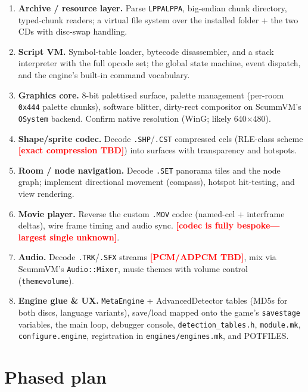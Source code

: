 \documentclass[11pt]{article}
\newcommand{\code}[1]{\texttt{#1}}
\newcommand{\todo}[1]{\textcolor{red}{\textbf{[#1]}}}
\begin{document}
\begin{enumerate}[label=\textbf{S\arabic*.},leftmargin=*]
  \item \textbf{Archive / resource layer.} Parse \code{LPPALPPA}, big-endian
        chunk directory, typed-chunk readers; a virtual file system over the
        installed folder + the two CDs with disc-swap handling.
  \item \textbf{Script VM.} Symbol-table loader, bytecode disassembler, and a
        stack interpreter with the full opcode set; the global state machine,
        event dispatch, and the engine's built-in command vocabulary.
  \item \textbf{Graphics core.} 8-bit palettised surface, palette management
        (per-room \code{0x444} palette chunks), software blitter, dirty-rect
        compositor on ScummVM's \code{OSystem} backend. Confirm native
        resolution (WinG; likely 640$\times$480).
  \item \textbf{Shape/sprite codec.} Decode \code{.SHP}/\code{.CST} compressed
        cels (RLE-class scheme \todo{exact compression TBD}) into surfaces with
        transparency and hotspots.
  \item \textbf{Room / node navigation.} Decode \code{.SET} panorama tiles and
        the node graph; implement directional movement (compass), hotspot
        hit-testing, and view rendering.
  \item \textbf{Movie player.} Reverse the custom \code{.MOV} codec
        (named-cel + interframe deltas), wire frame timing and audio sync.
        \todo{codec is fully bespoke---largest single unknown}.
  \item \textbf{Audio.} Decode \code{.TRK}/\code{.SFX} streams
        \todo{PCM/ADPCM TBD}, mix via ScummVM's \code{Audio::Mixer}, music
        themes with volume control (\code{themevolume}).
  \item \textbf{Engine glue \& UX.} \code{MetaEngine} + AdvancedDetector tables
        (MD5s for both discs, language variants), save/load mapped onto the
        game's \code{savestage} variables, the main loop, debugger console,
        \code{detection\_tables.h}, \code{module.mk}, \code{configure.engine},
        registration in \code{engines/engines.mk}, and POTFILES.
\end{enumerate}

\section{Phased plan}
\end{document}
